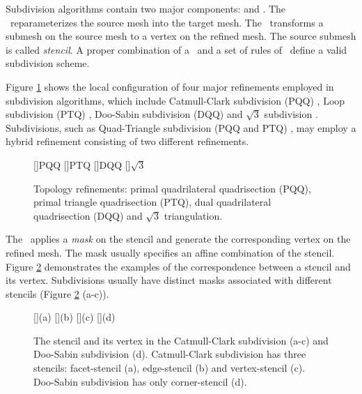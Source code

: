 Subdivision algorithms contain two major
components: \emph{\tr} and \emph{\gm}.
The \tr\ reparameterizes the source mesh into the target 
mesh. The \gm\ transforms a submesh on the source mesh
to a vertex on the refined mesh. The source submesh is called 
\emph{stencil}. A proper combination of a \tr\ and a set of 
rules of \gm\ define a valid subdivision scheme.

Figure \ref{fig:RefSchemes} shows the local configuration 
of four major refinements
employed in subdivision algorithms, which include Catmull-Clark
subdivision (PQQ) \cite{cc}, Loop subdivision (PTQ) \cite{loop},
Doo-Sabin subdivision (DQQ) \cite{ds} and $\sqrt{3}$ subdivision
\cite{sqrt3}. Subdivisions, such as Quad-Triangle subdivision (PQQ and
PTQ) \cite{qts,l-pg-03}, may employ a hybrid refinement consisting
of two different refinements.
\begin{figure}
  \centering
  []{\scriptsize PQQ} 
  []{\scriptsize PTQ}
  []{\scriptsize DQQ} 
  []{\scriptsize $\sqrt{3}$} 
  \caption{Topology refinements: 
    primal quadrilateral quadrisection (PQQ),
    primal triangle quadrisection (PTQ),
    dual quadrilateral quadrisection (DQQ) and
    $\sqrt{3}$ triangulation.}
  \label{fig:RefSchemes}
\end{figure}
The \gm\ applies a \emph{mask} on the stencil and
generate the corresponding vertex on the refined mesh.
The mask usually specifies an affine combination of the 
stencil. Figure \ref{fig:RefMap} demonstrates the examples of the
correspondence between a stencil and its vertex. Subdivisions 
usually have distinct masks associated with different stencils 
(Figure \ref{fig:RefMap} (a-c)). 
\begin{figure}
  \centering
  []{(a)}
  []{(b)}
  []{(c)}
  []{(d)}
  \caption{The stencil and its vertex in the 
           Catmull-Clark subdivision (a-c)
	   and Doo-Sabin subdivision (d). Catmull-Clark
	   subdivision has three stencils: facet-stencil (a), 
	   edge-stencil (b) and vertex-stencil (c). 
	   Doo-Sabin subdivision has only corner-stencil (d).}
  \label{fig:RefMap}
\end{figure}




%

%

